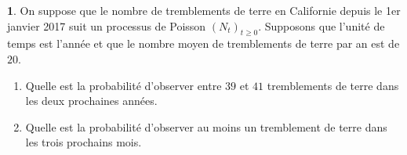 \documentclass[8pt,notheorems]{beamer}
\theoremstyle{definition}
\theoremstyle{example}
\newtheorem{example}{\translate{Exemple}}
\theoremstyle{mystyle}
\theoremstyle{plain}
\begin{document}
\begin{frame}
\begin{example}
On suppose que le nombre de tremblements de terre en Californie depuis le 1er janvier 2017 suit un processus de Poisson $(N_t)_{t\geq0}$. Supposons que l'unité de temps est l'année et que le nombre moyen de tremblements de terre par an est de $20$.
\begin{enumerate}
\item Quelle est la probabilité d'observer entre $39$ et $41$ tremblements de terre dans les deux prochaines années.
\item Quelle est la probabilité d'observer au moins un tremblement de terre dans les trois prochains mois.
\end{enumerate}
\end{example}
\end{frame}
\end{document}
